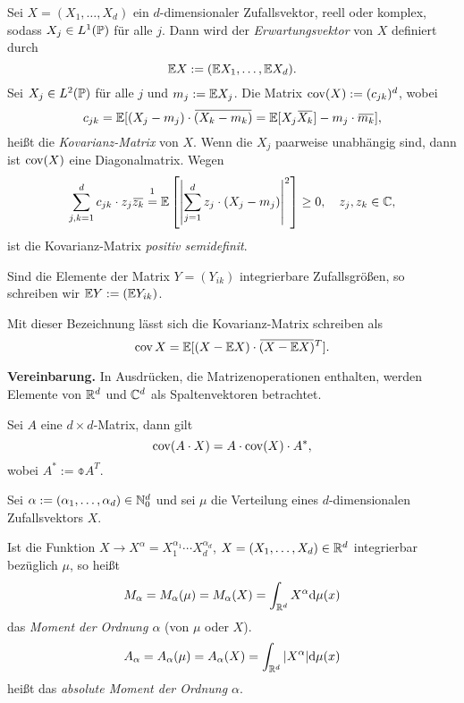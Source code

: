 \begin{prgp}[Zufallsvektoren]
  Sei $X = (X_1, \ldots, X_d)$ ein $d$-dimensionaler Zufallsvektor, reell oder
  komplex, sodass $X_j \in L^1(\mathbb{P})$ für alle $j$. Dann wird der
  \emph{Erwartungsvektor} von $X$ definiert durch
  \[ \mathbb{E} X := ( \mathbb{E} X_1, \ldots, \mathbb{E} X_d ). \]
  Sei $X_j \in L^2(\mathbb{P})$ für alle $j$ und $m_j := \mathbb{E} X_j$. Die Matrix $\operatorname{cov}(X)
  := (c_{jk})^d$, wobei
  \[ c_{jk} = \pE [ (X_j - m_j) \cdot \obar{(X_k - m_k)} = \pE[X_j \obar{X_k}] -
    m_j \cdot \obar{m_k} ], \]
  heißt die \emph{Kovarianz-Matrix} von $X$. Wenn die $X_j$ paarweise unabhängig
  sind, dann ist $\operatorname{cov}(X)$ eine Diagonalmatrix. Wegen
  \[ \sum_{j,k = 1}^d c_{jk} \cdot z_j \obar{z_k} \overset{\footnotemark}{=}
    \pE \left[ \left| \sum_{j=1}^d z_j \cdot (X_j - m_j) \right|^2 \right] \ge
    0,
    \quad
    z_j, z_k \in \complex,
  \]
  ist die Kovarianz-Matrix \emph{positiv semidefinit}.

  Sind die Elemente der Matrix $Y = (Y_{ik})$ integrierbare Zufallsgrößen, so
  schreiben wir $\mathbb{E} Y := (\mathbb{E} Y_{ik})$.

  Mit dieser Bezeichnung lässt sich die Kovarianz-Matrix schreiben als
  \[ \cov X = \pE[ (X - \pE X) \cdot \obar{(X-\pE X)}^T]. \]

  \textbf{Vereinbarung.} In Ausdrücken, die Matrizenoperationen enthalten,
  werden Elemente von $\mathbb{R}^d$ und $\mathbb{C}^d$ als Spaltenvektoren betrachtet.

  Sei $A$ eine $d \times d$-Matrix, dann gilt
  \[ \operatorname{cov}( A \cdot X ) = A \cdot \operatorname{cov}(X) \cdot A^*,\]
  wobei $A^* := \obar{A^T}$.
\end{prgp}

Sei $\alpha := (\alpha_1, \ldots, \alpha_d) \in \mathbb{N}_0^d$ und sei $\mu$ die
Verteilung eines $d$-dimensionalen Zufallsvektors $X$.

Ist die Funktion $X \to X^\alpha = X_1^{\alpha_1} \cdots X_d^{\alpha_d}$, $X =
(X_1, \ldots, X_d) \in \mathbb{R}^d$ integrierbar bezüglich $\mu$, so heißt
\[ M_\alpha = M_\alpha(\mu) = M_\alpha(X) = \int_{\mathbb{R}^d} X^\alpha \mathrm{d}
  \mu(x) \]
das \emph{Moment der Ordnung $\alpha$} (von $\mu$ oder $X$).
\[ A_\alpha = A_\alpha(\mu) = A_\alpha(X) = \int_{\mathbb{R}^d} |X^\alpha| \mathrm{d}
  \mu(x) \]
heißt das \emph{absolute Moment der Ordnung $\alpha$}.
